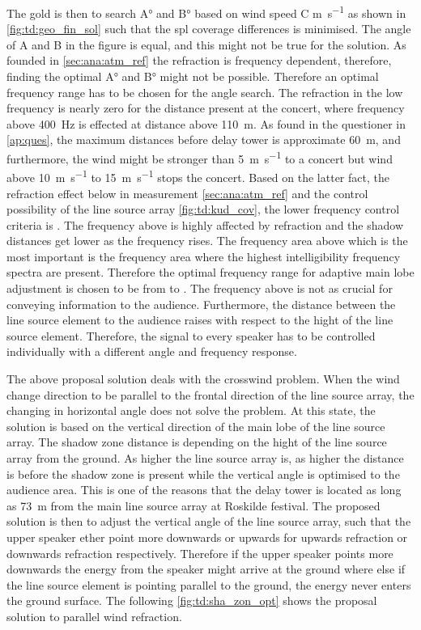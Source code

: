 The gold is then to search A\si{\degree} and B\si{\degree} based on wind speed C \si{\meter\per\second} as shown in \autoref{fig:td:geo_fin_sol} such that the \gls{spl} coverage differences is minimised. The angle of A and B in the figure is equal, and this might not be true for the solution. As founded in \autoref{sec:ana:atm_ref} the refraction is frequency dependent, therefore, finding the optimal  A\si{\degree} and B\si{\degree} might not be possible. Therefore an optimal frequency range has to be chosen for the angle search. The refraction in the low frequency is nearly zero for the distance present at the concert, where frequency above \SI{400}{\hertz} is effected at distance above \SI{110}{\meter}.  As found in the questioner in \autoref{ap:ques}, the maximum distances before delay tower is approximate \SI{60}{\meter}, and furthermore, the wind might be stronger than \SI{5}{\meter\per\second} to a concert but wind above \SI{10}{\meter\per\second} to \SI{15}{\meter\per\second} stops the concert. Based on the latter fact, the refraction effect below  in measurement \autoref{sec:ana:atm_ref} and the control possibility of the line source array \autoref{fig:td:kud_cov}, the lower frequency control criteria is . The frequency above  is highly affected by refraction and the shadow distances get lower as the frequency rises. 
The frequency area above  which is the most important is the frequency area where the highest intelligibility frequency spectra are present. Therefore the optimal frequency range for adaptive main lobe adjustment is chosen to be from  to . The frequency above is not as crucial for conveying information to the audience. Furthermore, the distance between the line source element to the audience raises with respect to the hight of the line source element. Therefore, the signal to every speaker has to be controlled individually with a different angle and frequency response. 

The above proposal solution deals with the crosswind problem. When the wind change direction to be parallel to the frontal direction of the line source array, the changing in horizontal angle does not solve the problem. At this state, the solution is based on the vertical direction of the main lobe of the line source array. The shadow zone distance is depending on the hight of the line source array from the ground. As higher the line source array is, as higher the distance is before the shadow zone is present while the vertical angle is optimised to the audience area. This is one of the reasons that the delay tower is located as long as \SI{73}{\meter} from the main line source array at Roskilde festival. The proposed solution is then to adjust the vertical angle of the line source array, such that the upper speaker ether point more downwards or upwards for upwards refraction or downwards refraction respectively. 
Therefore if the upper speaker points more downwards the energy from the speaker might arrive at the ground where else if the line source element is pointing parallel to the ground, the energy never enters the ground surface. The following \autoref{fig:td:sha_zon_opt} shows the proposal solution to parallel wind refraction.  

